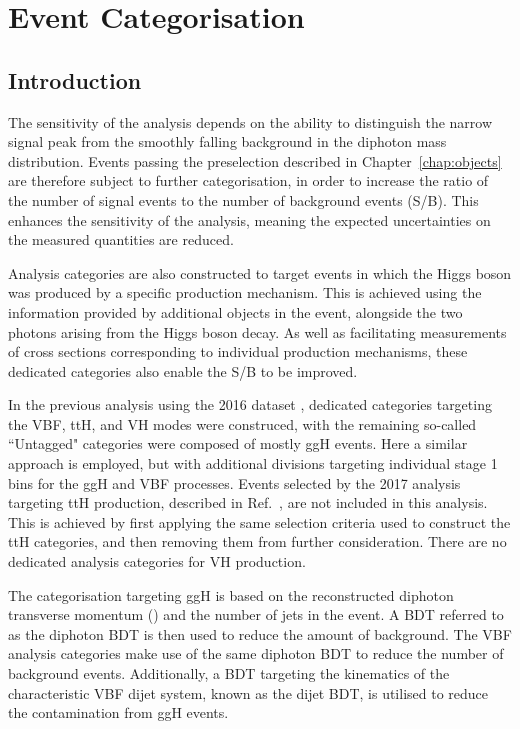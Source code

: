 \chapter{Event Categorisation}
\label{chap:categorisation}

\section{Introduction}

The sensitivity of the \Hgg analysis depends on the ability to distinguish the narrow signal peak 
from the smoothly falling background in the diphoton mass distribution.
Events passing the preselection described in Chapter~\ref{chap:objects} 
are therefore subject to further categorisation, in order to increase 
the ratio of the number of signal events to the number of background events (S/B).
This enhances the sensitivity of the analysis, 
meaning the expected uncertainties on the measured quantities are reduced.

Analysis categories are also constructed to target events in which the Higgs boson was 
produced by a specific production mechanism. 
This is achieved using the information provided by additional objects in the event, 
alongside the two photons arising from the Higgs boson decay.
As well as facilitating measurements of cross sections corresponding 
to individual production mechanisms, these dedicated categories also enable the S/B to be improved.

In the previous \Hgg analysis using the 2016 dataset \cite{HIG-16-040}, 
dedicated categories targeting the VBF, ttH, and VH modes were construced, 
with the remaining so-called ``Untagged" categories were composed of mostly ggH events.
Here a similar approach is employed, 
but with additional divisions targeting individual stage 1 bins for the ggH and VBF processes.
Events selected by the 2017 \Hgg analysis targeting ttH production, 
described in Ref.~\cite{HIG-18-018}, are not included in this analysis. 
This is achieved by first applying the same selection criteria used to construct the ttH categories, 
and then removing them from further consideration. 
There are no dedicated analysis categories for VH production.

The categorisation targeting ggH is based on the reconstructed diphoton transverse momentum (\ptgg) 
and the number of jets in the event. 
A BDT referred to as the diphoton BDT is then used to reduce the amount of background. 
The VBF analysis categories make use of the same diphoton BDT 
to reduce the number of background events. 
Additionally, a BDT targeting the kinematics of the characteristic VBF dijet system, 
known as the dijet BDT, is utilised to reduce the contamination from ggH events.


